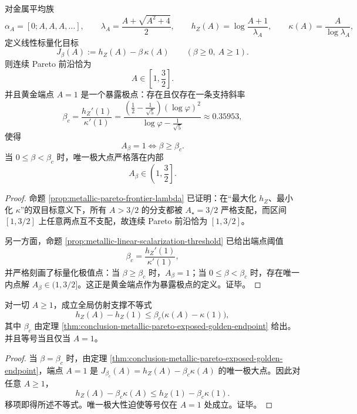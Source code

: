 \begin{theorem}\label{thm:conclusion-metallic-pareto-exposed-golden-endpoint}
对金属平均族
\[
\alpha_A=[0;A,A,A,\dots],
\qquad
\lambda_A=\frac{A+\sqrt{A^2+4}}{2},
\qquad
h_Z(A)=\log\frac{A+1}{\lambda_A},
\qquad
\kappa(A)=\frac{A}{\log\lambda_A},
\]
定义线性标量化目标
\[
J_\beta(A):=h_Z(A)-\beta\,\kappa(A)
\qquad (\beta\ge 0,\ A\ge 1).
\]
则连续 Pareto 前沿恰为
\[
A\in\left[1,\frac32\right].
\]
并且黄金端点 \(A=1\) 是一个暴露极点：存在且仅存在一条支持斜率
\[
\beta_c=
\frac{h_Z'(1)}{\kappa'(1)}
=
\frac{\left(\frac12-\frac1{\sqrt5}\right)(\log\varphi)^2}{\log\varphi-\frac1{\sqrt5}}
\approx 0.35953,
\]
使得
\[
A_\beta=1
\iff
\beta\ge \beta_c.
\]
当 \(0\le \beta<\beta_c\) 时，唯一极大点严格落在内部
\[
A_\beta\in\left(1,\frac32\right].
\]
\end{theorem}
\begin{proof}
命题 \ref{prop:metallic-pareto-frontier-lambda} 已证明：在“最大化 \(h_Z\)、最小化 \(\kappa\)”的双目标意义下，所有 \(A>3/2\) 的分支都被 \(A_\star=3/2\) 严格支配，而区间 \([1,3/2]\) 上任意两点互不支配，故连续 Pareto 前沿恰为 \([1,3/2]\)。

另一方面，命题 \ref{prop:metallic-linear-scalarization-threshold} 已给出端点阈值
\[
\beta_c=\frac{h_Z'(1)}{\kappa'(1)},
\]
并严格刻画了标量化极值点：当 \(\beta\ge \beta_c\) 时，\(A_\beta=1\)；当 \(0\le \beta<\beta_c\) 时，存在唯一内点解 \(A_\beta\in(1,3/2]\)。这正是黄金端点作为暴露极点的定义。证毕。
\end{proof}

\begin{corollary}[黄金端点的精确支撑超平面]\label{cor:conclusion-metallic-golden-supporting-hyperplane}
对一切 \(A\ge 1\)，成立全局仿射支撑不等式
\[
h_Z(A)-h_Z(1)\le
\beta_c\bigl(\kappa(A)-\kappa(1)\bigr),
\]
其中 \(\beta_c\) 由定理 \ref{thm:conclusion-metallic-pareto-exposed-golden-endpoint} 给出。并且等号当且仅当 \(A=1\)。
\end{corollary}
\begin{proof}
当 \(\beta=\beta_c\) 时，由定理 \ref{thm:conclusion-metallic-pareto-exposed-golden-endpoint}，端点 \(A=1\) 是 \(J_{\beta_c}(A)=h_Z(A)-\beta_c\kappa(A)\) 的唯一极大点。因此对任意 \(A\ge 1\)，
\[
h_Z(A)-\beta_c\kappa(A)\le h_Z(1)-\beta_c\kappa(1).
\]
移项即得所述不等式。唯一极大性迫使等号仅在 \(A=1\) 处成立。证毕。
\end{proof}

